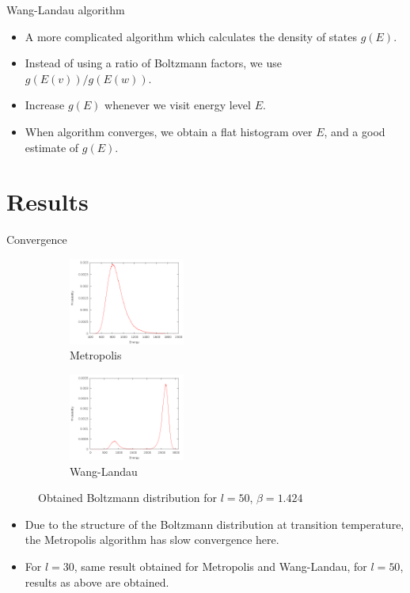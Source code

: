 \documentclass{beamer}
\begin{document}
\begin{frame}{Wang-Landau algorithm}
    \begin{itemize}
        \item A more complicated algorithm which calculates the density of states $g(E)$.
        \item Instead of using a ratio of Boltzmann factors, we use $g(E(v))/g(E(w))$.
        \item Increase $g(E)$ whenever we visit energy level $E$.
        \item When algorithm converges, we obtain a flat histogram over $E$, and a good estimate of $g(E)$.
    \end{itemize}
\end{frame}
\section{Results}
\begin{frame}{Convergence}
    \begin{figure}[H]
        \begin{subfigure}[t]{1.5in}\includegraphics[width=1.5in]{../results/metropolis/m50.png}\caption{Metropolis}\end{subfigure}
        \begin{subfigure}[t]{1.5in}\includegraphics[width=1.5in]{../results/wanglandau/b50.png}\caption{Wang-Landau}\end{subfigure}
        \caption{Obtained Boltzmann distribution for $l = 50$, $\beta = 1.424$}
    \end{figure}
    \begin{itemize}
        \item Due to the structure of the Boltzmann distribution at transition temperature, the Metropolis algorithm has slow convergence here.
        \item For $l = 30$, same result obtained for Metropolis and Wang-Landau, for $l = 50$, results as above are obtained.
    \end{itemize}
\end{frame}
\end{document}
